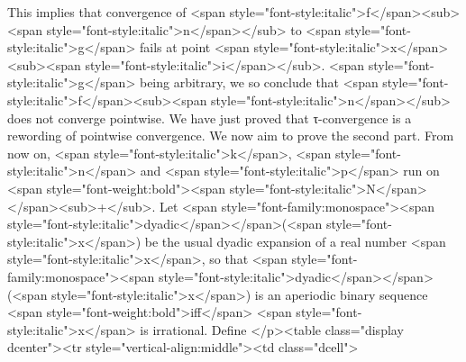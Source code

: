 {{{{This implies that convergence of <span style="font-style:italic">f</span><sub><span style="font-style:italic">n</span></sub> to <span style="font-style:italic">g</span> fails at point <span style="font-style:italic">x</span><sub><span style="font-style:italic">i</span></sub>.
<span style="font-style:italic">g</span> being arbitrary, we so conclude that <span style="font-style:italic">f</span><sub><span style="font-style:italic">n</span></sub> does not converge pointwise.
We have just proved that 
τ-convergence is a rewording of pointwise convergence.
We now aim to prove the second part.
From now on, 
<span style="font-style:italic">k</span>, <span style="font-style:italic">n</span> and <span style="font-style:italic">p</span> 
run on <span style="font-weight:bold"><span style="font-style:italic">N</span></span><sub>+</sub>. Let <span style="font-family:monospace"><span style="font-style:italic">dyadic</span></span>(<span style="font-style:italic">x</span>) be the usual dyadic expansion of a real number <span style="font-style:italic">x</span>, 
so that <span style="font-family:monospace"><span style="font-style:italic">dyadic</span></span>(<span style="font-style:italic">x</span>) is an aperiodic binary sequence <span style="font-weight:bold">iff</span> <span style="font-style:italic">x</span> is irrational. 
Define
</p><table class="display dcenter"><tr style="vertical-align:middle"><td class="dcell">
     

}}}}
